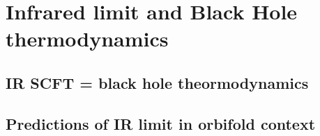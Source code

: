 
\chapter{Infrared limit and Black Hole thermodynamics}
\label{chap:infrared}
\pagestyle{fancy}

\section{IR SCFT = black hole theormodynamics}

\section{Predictions of IR limit in orbifold context}